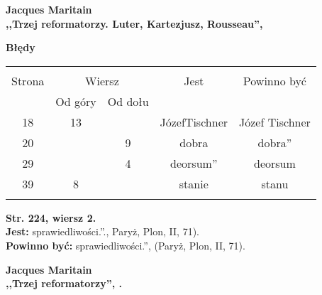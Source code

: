 \documentclass[a4paper,11pt]{article}
\newcommand{\spaceOne}{2em}
\newcommand{\tb}{\textbf}
\newcommand{\noi}{\noindent}
\newcommand{\Center}[1]{\begin{center} #1 \end{center}}
\newcommand{\CenterTB}[1]{\Center{\tb{#1}}}
\newcommand{\StrWg}[2]{\tb{Str. #1, wiersz #2.}}
\newcommand{\Jest}{\tb{Jest: }}
\newcommand{\Pow}{\tb{Powinno być: }}
\newcommand{\Work}[1]{ \begin{center} {\large \tb{#1}} \end{center} }
\begin{document}
\vspace{\spaceOne}



\Work{ Jacques Maritain \\
  ,,Trzej reformatorzy. Luter, Kartezjusz, Rousseau'', \cite{Mar05} }


\CenterTB{Błędy}
\begin{center}
  \begin{tabular}{|c|c|c|c|c|}
    \hline
    & \multicolumn{2}{c|}{} & & \\
    Strona & \multicolumn{2}{c|}{Wiersz}& Jest & Powinno być \\ \cline{2-3}
    & Od góry & Od dołu &  &  \\ \hline
    18 & 13 & & JózefTischner & Józef Tischner \\
    20 & & 9 & dobra & dobra'' \\
    29 & & 4 & deorsum'' & deorsum \\
    39 & 8 & & stanie & stanu \\
    & & & & \\ \hline
  \end{tabular}
\end{center}
\noi
\StrWg{224}{2} \\
\Jest sprawiedliwości.''., Paryż, Plon, II, 71). \\
\Pow sprawiedliwości.'', (Paryż, Plon, II, 71). \\

\vspace{\spaceOne}



\Work{ Jacques Maritain\\
  ,,Trzej reformatorzy'', \cite{JMTR}.}


%
%
%
\end{document}
